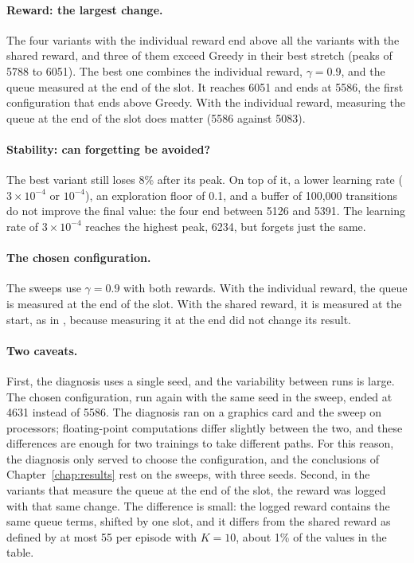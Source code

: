 \paragraph{Reward: the largest change.}  The four variants with the individual reward end above all the
variants with the shared reward, and three of them exceed Greedy in their best stretch (peaks of 5788 to
6051). The best one combines the individual reward, $\gamma = 0.9$, and the queue measured at the end of the
slot. It reaches 6051 and ends at 5586, the first configuration that ends above Greedy. With the individual
reward, measuring the queue at the end of the slot does matter (5586 against 5083). 

\paragraph{Stability: can forgetting be avoided?}  The best variant still loses 8\% after its peak. On top of
it, a lower learning rate ($3 \times 10^{-4}$ or $10^{-4}$), an exploration floor of 0.1, and a buffer of
100,000 transitions do not improve the final value: the four end between 5126 and 5391. The learning rate of
$3 \times 10^{-4}$ reaches the highest peak, 6234, but forgets just the same.

\paragraph{The chosen configuration.}  The sweeps use $\gamma = 0.9$ with both rewards. With the individual
reward, the queue is measured at the end of the slot. With the shared reward, it is measured at the start,
as in \citet{li+22fedmarl}, because measuring it at the end did not change its result. 

\enlargethispage{\baselineskip}%
\paragraph{Two caveats.}  First, the diagnosis uses a single seed, and the variability between runs is large.
The chosen configuration, run again with the same seed in the sweep, ended at 4631 instead of 5586. The
diagnosis ran on a graphics card and the sweep on processors; floating-point computations differ slightly
between the two, and these differences are enough for two trainings to take different paths. For this
reason, the diagnosis only served to choose the configuration, and the conclusions of Chapter~\ref{chap:results}
rest on the sweeps, with three seeds. Second, in the variants that measure the queue at the end of the slot,
the reward was logged with that same change. The difference is small: the logged reward contains the same
queue terms, shifted by one slot, and it differs from the shared reward as defined by at most 55 per episode
with $K = 10$, about 1\% of the values in the table.
